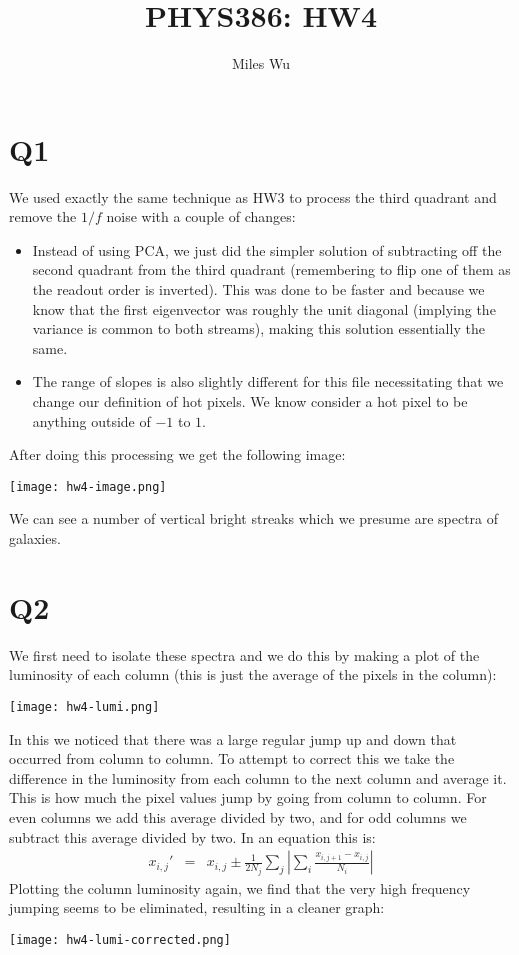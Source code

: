 \documentclass[12pt]{article}
\begin{document}
\title{PHYS386: HW4}
\author{Miles Wu}
\maketitle

\section{Q1}
We used exactly the same technique as HW3 to process the third quadrant and remove the $1/f$ noise with a couple of changes:
\begin{itemize}
\item Instead of using PCA, we just did the simpler solution of subtracting off the second quadrant from the third quadrant (remembering to flip one of them as the readout order is inverted). This was done to be faster and because we know that the first eigenvector was roughly the unit diagonal (implying the variance is common to both streams), making this solution essentially the same.
\item The range of slopes is also slightly different for this file necessitating that we change our definition of hot pixels. We know consider a hot pixel to be anything outside of $-1$ to $1$.
\end{itemize}

After doing this processing we get the following image:
\begin{center}
\texttt{[image: hw4-image.png]}
\end{center}
We can see a number of vertical bright streaks which we presume are spectra of galaxies.

\section{Q2}
We first need to isolate these spectra and we do this by making a plot of the luminosity of each column (this is just the average of the pixels in the column):
\begin{center}
\texttt{[image: hw4-lumi.png]}
\end{center}

In this we noticed that there was a large regular jump up and down that occurred from column to column.
To attempt to correct this we take the difference in the luminosity from each column to the next column and average it.
This is how much the pixel values jump by going from column to column.
For even columns we add this average divided by two, and for odd columns we subtract this average divided by two.
In an equation this is:
\begin{eqnarray}
	x_{i,j}' &=& x_{i,j} \pm \frac{1}{2 N_j} \sum_j | \sum_i \frac{x_{i,j+1} - x_{i,j}}{N_i} |
\end{eqnarray}
Plotting the column luminosity again, we find that the very high frequency jumping seems to be eliminated, resulting in a cleaner graph:
\begin{center}
\texttt{[image: hw4-lumi-corrected.png]}
\end{center}
\end{document}
